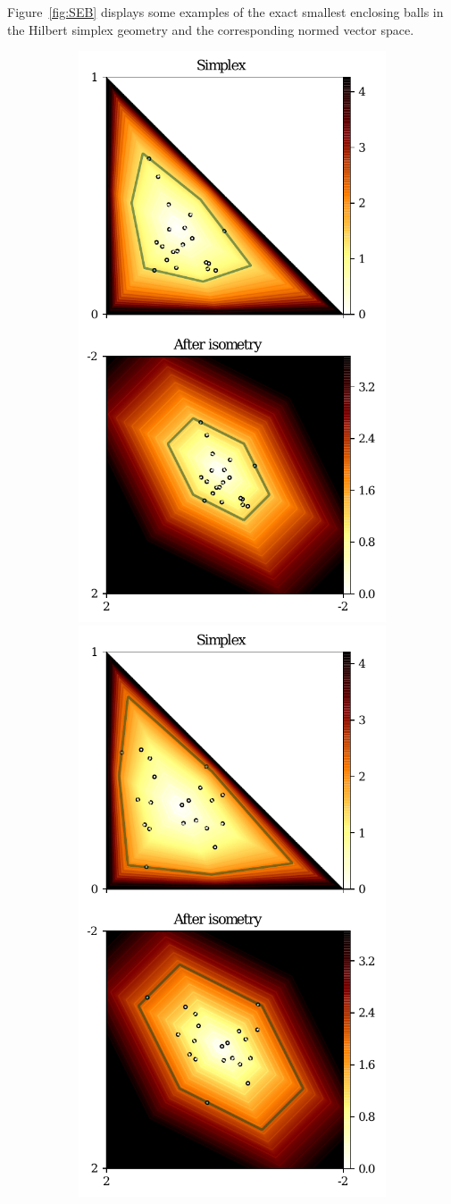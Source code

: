\documentclass[graybox]{svmult}
\begin{document}
Figure~\ref{fig:SEB} displays some examples of the exact smallest enclosing balls in the Hilbert simplex geometry and the corresponding normed vector space.

\begin{figure}[t]
\centering
\begin{subfigure}[m]{.48\textwidth}
\includegraphics[width=.5\textwidth]{harpe2017.pdf}%
\includegraphics[width=.5\textwidth]{harpe2026.pdf}

\end{subfigure}
\end{figure}
\end{document}
